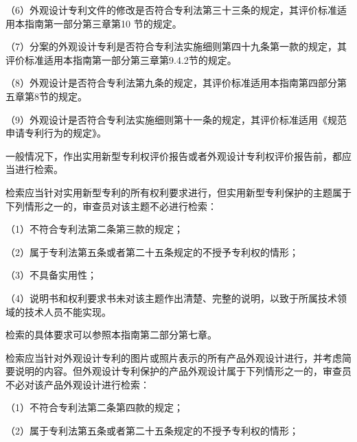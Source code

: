 {\setlength{\parindent}{17.1bp}（6）外观设计专利文件的修改是否符合专利法第三十三条的规定，其评价标准适用本指南第一部分第三章第10 节的规定。\par}

{\setlength{\parindent}{17.1bp}（7）分案的外观设计专利是否符合专利法实施细则第四十九条第一款的规定，其评价标准适用本指南第一部分第三章第9.4.2节的规定。\par}

{\setlength{\parindent}{17.1bp}（8）外观设计是否符合专利法第九条的规定，其评价标准适用本指南第四部分第五章第8节的规定。\par}

{\setlength{\parindent}{17.1bp}（9）外观设计是否符合专利法实施细则第十一条的规定，其评价标准适用《规范申请专利行为的规定》。\par}

一般情况下，作出实用新型专利权评价报告或者外观设计专利权评价报告前，都应当进行检索。

检索应当针对实用新型专利的所有权利要求进行，但实用新型专利保护的主题属于下列情形之一的，审查员对该主题不必进行检索：

{\setlength{\parindent}{17.1bp}（1）不符合专利法第二条第三款的规定；\par}

{\setlength{\parindent}{17.1bp}（2）属于专利法第五条或者第二十五条规定的不授予专利权的情形；\par}

{\setlength{\parindent}{17.1bp}（3）不具备实用性；\par}

{\setlength{\parindent}{17.1bp}（4）说明书和权利要求书未对该主题作出清楚、完整的说明，以致于所属技术领域的技术人员不能实现。\par}

检索的具体要求可以参照本指南第二部分第七章。

检索应当针对外观设计专利的图片或照片表示的所有产品外观设计进行，并考虑简要说明的内容。但外观设计专利保护的产品外观设计属于下列情形之一的，审查员不必对该产品外观设计进行检索：

{\setlength{\parindent}{17.1bp}（1）不符合专利法第二条第四款的规定；\par}

{\setlength{\parindent}{17.1bp}（2）属于专利法第五条或者第二十五条规定的不授予专利权的情形；\par}


